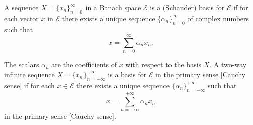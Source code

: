 A sequence $X = \{x_n\}_{n=0}^{\infty}$ in a Banach space $\mathcal{E}$ is a (Schauder) basis for $\mathcal{E}$ if for each vector $x$ in $\mathcal{E}$ there exists a unique sequence $\{\alpha_n\}_{n=0}^{\infty}$ of complex numbers such that
$$x = \sum_{n=0}^{\infty} \alpha_n x_n.$$

The scalars $\alpha_n$ are the coefficients of $x$ with respect to the basis $X$. A two-way infinite sequence $X = \{x_n\}_{n=-\infty}^{+\infty}$ is a basis for $\mathcal{E}$ in the primary sense [Cauchy sense] if for each $x \in \mathcal{E}$ there exists a unique sequence $\{\alpha_n\}_{n=-\infty}^{+\infty}$ such that
$$x = \sum_{n=-\infty}^{+\infty} \alpha_n x_n$$
in the primary sense [Cauchy sense].
